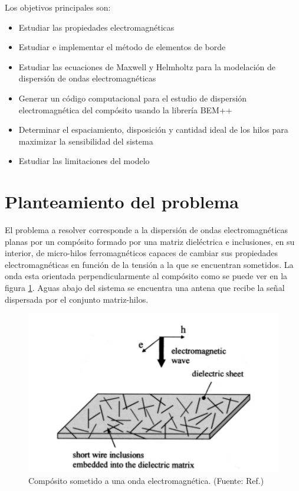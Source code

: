 \documentclass[12pt,letterpaper]{article}
\numberwithin{equation}{section}
\begin{document}
Los objetivos principales son:

\begin{itemize}
	\item Estudiar las propiedades electromagnéticas
	\item Estudiar e implementar el método de elementos de borde
	\item Estudiar las ecuaciones de Maxwell y Helmholtz para la modelación de dispersión de ondas electromagnéticas
	\item Generar un código computacional para el estudio de dispersión electromagnética del compósito usando la librería BEM++
	\item Determinar el espaciamiento, disposición y cantidad ideal de los hilos para maximizar la sensibilidad del sistema
	\item Estudiar las limitaciones del modelo
\end{itemize}

\pagebreak
\section{Planteamiento del problema}
El problema a resolver corresponde a la dispersión de ondas electromagnéticas planas por un compósito formado por una matriz dieléctrica e inclusiones, en su interior, de micro-hilos ferromagnéticos capaces de cambiar sus propiedades electromagnéticas en función de la tensión a la que se encuentran sometidos. La onda esta orientada perpendicularmente al compósito como se puede ver en la figura \ref{fig: composito}. Aguas abajo del sistema se encuentra una antena que recibe la señal dispersada por el conjunto matriz-hilos.

\begin{figure}[H]
	\centering\includegraphics[scale=0.6]{Imagenes/composito.png}
	\caption{Compósito sometido a una onda electromagnética. (Fuente: Ref.\cite{Wire_theory_1})}
	\label{fig: composito}
\end{figure} 
\end{document}
